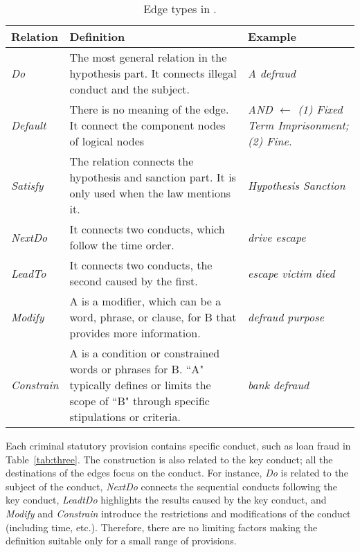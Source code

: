 \begin{table}[!h]
    \centering
    \small
    \begin{tabular}{p{} p{} p{}}
    \toprule
        Relation & Definition & Example\\ 
        \hline
        \textit{Do} & The most general relation in the hypothesis part. It connects illegal conduct and the subject. & \textit{A \raisebox{-0.6ex}{${\stackrel{Do}{\longrightarrow}}$} defraud}\\
        \hline
        \textit{Default} & There is no meaning of the edge. It connect the component nodes of logical nodes & \textit{AND ${\longleftarrow}$ (1) Fixed Term Imprisonment; (2) Fine.}\\
        \hline
        \textit{Satisfy} & The relation connects the hypothesis and sanction part. It is only used when the law mentions it.  &  \textit{Hypothesis \raisebox{-0.6ex}{${\stackrel{Satisfy}{\longrightarrow}}$} Sanction} \\
        \hline
        \textit{NextDo} &
        It connects two conducts, which follow the time order. & \textit{drive \raisebox{-0.6ex}{${\stackrel{NextDo}{\longrightarrow}}$} escape}\\
        \hline
        \textit{LeadTo} &
        It connects two conducts, the second caused by the first. & \textit{escape \raisebox{-0.6ex}{${\stackrel{LeadTo}{\longrightarrow}}$} victim died}\\
        \hline
        \textit{Modify} &
        A is a modifier, which can be a word, phrase, or clause, for B that provides more information. & \textit{defraud \raisebox{-0.6ex}{${\stackrel{Modify}{\longrightarrow}}$} purpose}\\
        \hline
        \textit{Constrain} &
        A is a condition or constrained words or phrases for B. ``A" typically defines or limits the scope of ``B" through specific stipulations or criteria. & \textit{bank \raisebox{-0.6ex}{${\stackrel{Constrain}{\longrightarrow}}$} defraud} \\
        \bottomrule
    \end{tabular}
    \caption{Edge types in \lawgraph{}.}
    \label{apptab:edge}
\end{table}

Each criminal statutory provision contains specific conduct, such as loan fraud in Table~\ref{tab:three}. The \lawgraph{} construction is also related to the key conduct; all the destinations of the edges focus on the conduct. For instance, \textit{Do} is related to the subject of the conduct, \textit{NextDo} connects the sequential conducts following the key conduct, \textit{LeadtDo} highlights the results caused by the key conduct, and \textit{Modify} and \textit{Constrain} introduce the restrictions and modifications of the conduct (including time, etc.). Therefore, there are no limiting factors making the definition suitable only for a small range of provisions.